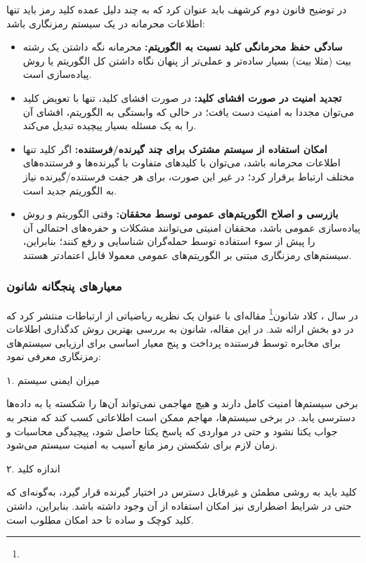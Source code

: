 در توضیح قانون دوم کرشهف باید عنوان کرد که به چند دلیل عمده کلید رمز باید تنها اطلاعات محرمانه در یک سیستم رمزنگاری باشد:

\begin{itemize}
    \item \textbf{سادگی حفظ محرمانگی کلید نسبت به الگوریتم:} محرمانه نگه داشتن یک رشته بیت (مثلا  بیت) بسیار ساده‌تر و عملی‌تر از پنهان نگاه داشتن کل الگوریتم یا روش پیاده‌سازی است.
    \item \textbf{تجدید امنیت در صورت افشای کلید:} در صورت افشای کلید، تنها با تعویض کلید می‌توان مجددا به امنیت دست یافت؛ در حالی که وابستگی به الگوریتم، افشای آن را به یک مسئله بسیار پیچیده تبدیل می‌کند.
    \item \textbf{امکان استفاده از سیستم مشترک برای چند گیرنده/فرستنده:} اگر کلید تنها اطلاعات محرمانه باشد، می‌توان با کلیدهای متفاوت با گیرنده‌ها و فرستنده‌های مختلف ارتباط برقرار کرد؛ در غیر این صورت، برای هر جفت فرستنده/گیرنده نیاز به الگوریتم جدید است.
    \item \textbf{بازرسی و اصلاح الگوریتم‌های عمومی توسط محققان:} وقتی الگوریتم و روش پیاده‌سازی عمومی باشد، محققان امنیتی می‌توانند مشکلات و حفره‌های احتمالی آن را پیش از سوء استفاده توسط حمله‌گران شناسایی و رفع کنند؛ بنابراین، سیستم‌های رمزنگاری مبتنی بر الگوریتم‌های عمومی معمولا قابل اعتمادتر هستند\cite{ref36}.
\end{itemize}

\subsubsection{معیارهای پنجگانه شانون}

در سال ، کلاد شانون\footnote{} مقاله‌ای با عنوان یک نظریه ریاضیاتی از ارتباطات منتشر کرد که در دو بخش ارائه شد. در این مقاله، شانون به بررسی بهترین روش کدگذاری اطلاعات برای مخابره توسط فرستنده پرداخت و پنج معیار اساسی برای ارزیابی سیستم‌های رمزنگاری معرفی نمود\cite{ref37}:

۱. میزان ایمنی سیستم

برخی سیستم‌ها امنیت کامل دارند و هیچ مهاجمی نمی‌تواند آن‌ها را شکسته یا به داده‌ها دسترسی یابد. در برخی سیستم‌ها، مهاجم ممکن است اطلاعاتی کسب کند که منجر به جواب یکتا نشود و حتی در مواردی که پاسخ یکتا حاصل شود، پیچیدگی محاسبات و زمان لازم برای شکستن رمز مانع آسیب به امنیت سیستم می‌شود.

۲. اندازه کلید

کلید باید به روشی مطمئن و غیرقابل دسترس در اختیار گیرنده قرار گیرد، به‌گونه‌ای که حتی در شرایط اضطراری نیز امکان استفاده از آن وجود داشته باشد. بنابراین، داشتن کلید کوچک و ساده تا حد امکان مطلوب است.

